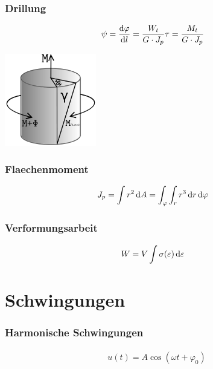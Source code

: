 \subsubsection*{Drillung}

\begin{multicols}{2}{}
\begin{align*}
\psi&=\frac{\mathop{}\!\mathrm{d} \varphi}{\mathop{}\!\mathrm{d} l}=\frac{W_t}{G\cdot J_p}\tau=\frac{M_t}{G\cdot J_p}
\end{align*}
\hfill

\begin{center}
 \includegraphics[width=40mm,height=40mm,keepaspectratio=true]{./Physik/Bilder/Scherbeanspruchung.png}
\end{center}
\end{multicols}


\begin{multicols}{2}{}
\subsubsection*{Flaechenmoment}
\begin{align*}
J_p&=\int r^2\mathop{}\!\mathrm{d} A=\int_\varphi\int_r r^3\mathop{}\!\mathrm{d} r \mathop{}\!\mathrm{d} \varphi 
\end{align*}


\subsubsection*{Verformungsarbeit}
\begin{align*}
W&=V\int \sigma(\varepsilon) \mathop{}\!\mathrm{d} \varepsilon 
\end{align*}
\end{multicols}


\section{Schwingungen}


\subsubsection*{Harmonische Schwingungen}
\begin{align*}
u(t)=A\cos(\omega t+\varphi_0)
\end{align*}


